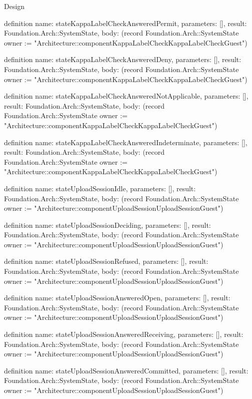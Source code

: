 \begin{lexlean}{Design}
\begin{semanticmodule}
definition{
  name: stateKappaLabelCheckAnsweredPermit,
  parameters: [],
  result: Foundation.Arch::SystemState,
  body: (record Foundation.Arch::SystemState {owner := "Architecture::componentKappaLabelCheckKappaLabelCheckGuest"})
}

definition{
  name: stateKappaLabelCheckAnsweredDeny,
  parameters: [],
  result: Foundation.Arch::SystemState,
  body: (record Foundation.Arch::SystemState {owner := "Architecture::componentKappaLabelCheckKappaLabelCheckGuest"})
}

definition{
  name: stateKappaLabelCheckAnsweredNotApplicable,
  parameters: [],
  result: Foundation.Arch::SystemState,
  body: (record Foundation.Arch::SystemState {owner := "Architecture::componentKappaLabelCheckKappaLabelCheckGuest"})
}

definition{
  name: stateKappaLabelCheckAnsweredIndeterminate,
  parameters: [],
  result: Foundation.Arch::SystemState,
  body: (record Foundation.Arch::SystemState {owner := "Architecture::componentKappaLabelCheckKappaLabelCheckGuest"})
}

definition{
  name: stateUploadSessionIdle,
  parameters: [],
  result: Foundation.Arch::SystemState,
  body: (record Foundation.Arch::SystemState {owner := "Architecture::componentUploadSessionUploadSessionGuest"})
}

definition{
  name: stateUploadSessionDeciding,
  parameters: [],
  result: Foundation.Arch::SystemState,
  body: (record Foundation.Arch::SystemState {owner := "Architecture::componentUploadSessionUploadSessionGuest"})
}

definition{
  name: stateUploadSessionRefused,
  parameters: [],
  result: Foundation.Arch::SystemState,
  body: (record Foundation.Arch::SystemState {owner := "Architecture::componentUploadSessionUploadSessionGuest"})
}

definition{
  name: stateUploadSessionAnsweredOpen,
  parameters: [],
  result: Foundation.Arch::SystemState,
  body: (record Foundation.Arch::SystemState {owner := "Architecture::componentUploadSessionUploadSessionGuest"})
}

definition{
  name: stateUploadSessionAnsweredReceiving,
  parameters: [],
  result: Foundation.Arch::SystemState,
  body: (record Foundation.Arch::SystemState {owner := "Architecture::componentUploadSessionUploadSessionGuest"})
}

definition{
  name: stateUploadSessionAnsweredCommitted,
  parameters: [],
  result: Foundation.Arch::SystemState,
  body: (record Foundation.Arch::SystemState {owner := "Architecture::componentUploadSessionUploadSessionGuest"})
}


\end{semanticmodule}
\end{lexlean}
